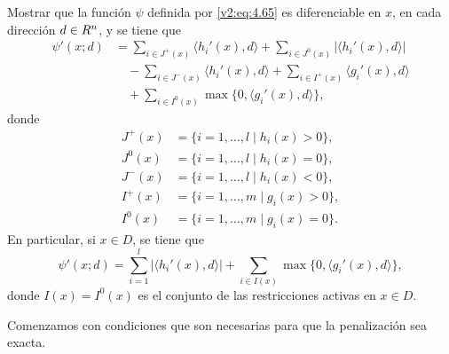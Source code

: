 Mostrar que la función $\psi$ definida por \eqref{v2:eq:4.65} es diferenciable en $x$, en cada dirección $d \in R^n$, y se tiene que
\begin{align}
    \psi'(x; d) &= \sum_{i \in J^+(x)} \langle h_i'(x), d \rangle + \sum_{i \in J^0(x)} |\langle h_i'(x), d \rangle| \nonumber \\
    &\quad - \sum_{i \in J^-(x)} \langle h_i'(x), d \rangle + \sum_{i \in I^+(x)} \langle g_i'(x), d \rangle \nonumber \\
    &\quad + \sum_{i \in I^0(x)} \max\{0, \langle g_i'(x), d \rangle\},
    \label{v2:eq:4.69}
\end{align}
donde
\begin{align*}
    J^+(x) &= \{i = 1, \dots, l \mid h_i(x) > 0\}, \\
    J^0(x) &= \{i = 1, \dots, l \mid h_i(x) = 0\}, \\
    J^-(x) &= \{i = 1, \dots, l \mid h_i(x) < 0\}, \\
    I^+(x) &= \{i = 1, \dots, m \mid g_i(x) > 0\}, \\
    I^0(x) &= \{i = 1, \dots, m \mid g_i(x) = 0\}.
\end{align*}
En particular, si $x \in D$, se tiene que
\begin{equation}
    \psi'(x; d) = \sum_{i=1}^l |\langle h_i'(x), d \rangle| + \sum_{i \in I(x)} \max\{0, \langle g_i'(x), d \rangle\},
    \label{v2:eq:4.70}
\end{equation}
donde $I(x) = I^0(x)$ es el conjunto de las restricciones activas en $x \in D$.

Comenzamos con condiciones que son necesarias para que la penalización sea exacta.

